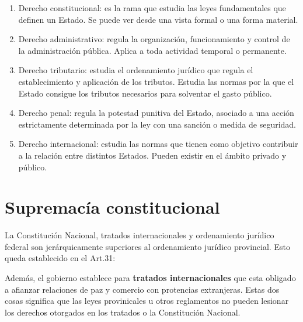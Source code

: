 \documentclass[../main.tex]{subfiles}
\begin{document}
\begin{enumerate}
  \item Derecho constitucional: es la rama que estudia las leyes fundamentales 
    que definen un Estado. Se puede ver desde una vista formal o una forma material.
  \item Derecho administrativo: regula la organización, funcionamiento y control
    de la administración pública. Aplica a toda actividad temporal o permanente.
  \item Derecho tributario: estudia el ordenamiento jurídico que regula el 
    establecimiento y aplicación de los tributos. Estudia las normas por la que
    el Estado consigue los tributos necesarios para solventar el gasto público.
  \item Derecho penal: regula la potestad punitiva del Estado, asociado a una 
    acción estrictamente determinada por la ley con una sanción o medida de seguridad.
  \item Derecho internacional: estudia las normas que tienen como objetivo 
    contribuir a la relación entre distintos Estados. Pueden existir en el ámbito privado y público.
\end{enumerate}

\section{Supremacía constitucional}

La Constitución Nacional, tratados internacionales y ordenamiento jurídico federal
son jerárquicamente superiores al ordenamiento jurídico provincial. Esto queda 
establecido en el Art.31:

\vspace{0.333cm}
\begin{center}
\end{center}
\vspace{0.3cm}

Además, el gobierno establece para \textbf{tratados internacionales} que esta obligado
a afianzar relaciones de paz y comercio con protencias extranjeras. Estas dos 
cosas significa que las leyes provinicales u otros reglamentos no pueden lesionar
los derechos otorgados en los tratados o la Constitución Nacional. 
\end{document}
